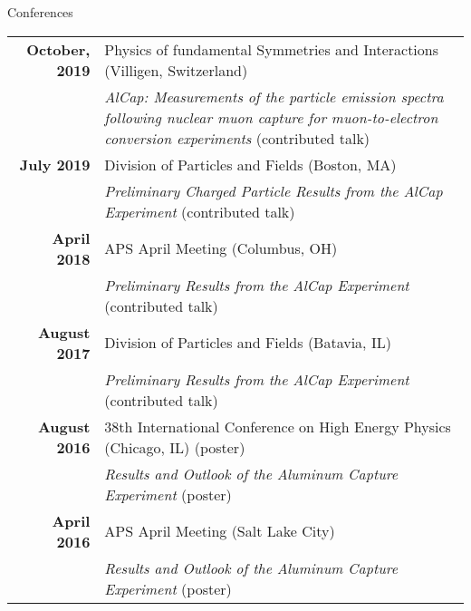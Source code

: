 \begin{center}
{\large Conferences}
\end{center}
\begin{tabular}{rp{10cm}}
  {\bf October, 2019} & Physics of fundamental Symmetries and Interactions (Villigen, Switzerland)\\
                      & {\it AlCap: Measurements of the particle emission spectra following nuclear muon capture for muon-to-electron conversion experiments} (contributed talk) \\
  {\bf July 2019}     & Division of Particles and Fields (Boston, MA) \\
                      & {\it Preliminary Charged Particle Results from the AlCap Experiment} (contributed talk) \\
  {\bf April 2018}    & APS April Meeting (Columbus, OH) \\
                      & {\it Preliminary Results from the AlCap Experiment} (contributed talk) \\
  {\bf August 2017}   & Division of Particles and Fields (Batavia, IL) \\
                      & {\it Preliminary Results from the AlCap Experiment} (contributed talk) \\
  {\bf August 2016}   & 38th International Conference on High Energy Physics (Chicago, IL) (poster) \\
                      & {\it Results and Outlook of the Aluminum Capture Experiment} (poster) \\
  {\bf April 2016}    & APS April Meeting (Salt Lake City) \\
                      & {\it Results and Outlook of the Aluminum Capture Experiment} (poster)
\end{tabular}

